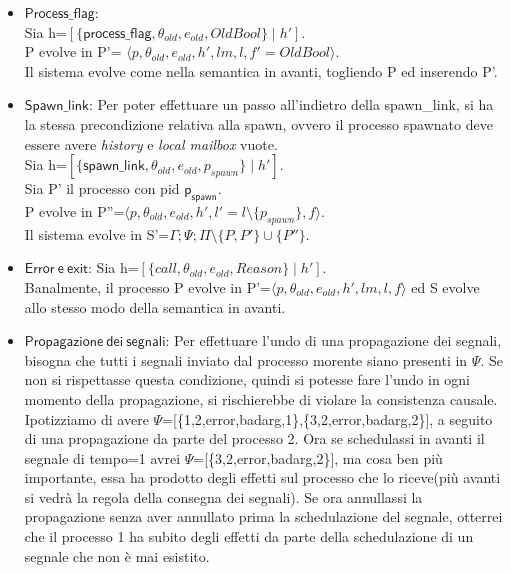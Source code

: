 \documentclass[Contributo.tex]{subfiles}
\begin{document}
	\begin{itemize}
		\item $\mathsf{Process\_flag}$:\\
		Sia h=$\displaystyle [\{\mathsf{process\_flag},\theta_{old},e_{old},OldBool\} \mid h']$.\\
		P evolve in P'= $\displaystyle \langle p,\theta_{old},e_{old},h',lm,l,f'=OldBool \rangle$.\\
		Il sistema evolve come nella semantica in avanti, togliendo P ed inserendo P'.
		\item $\mathsf{Spawn\_link}$:
		Per poter effettuare un passo all'indietro della spawn\_link, si ha la stessa precondizione relativa alla spawn, ovvero il processo spawnato deve essere avere \textit{history} e \textit{local mailbox} vuote.\\
		Sia h=$\displaystyle [\{\mathsf{spawn\_link},\theta_{old},e_{old},p_{spawn}\} \mid h']$.\\
		Sia P' il processo con pid $\mathsf{p_{spawn}}$.\\
		P evolve in P''=$\displaystyle \langle p,\theta_{old},e_{old},h',l'=l \setminus \{p_{spawn}\},f \rangle$.\\
		Il sistema evolve in S'=$\displaystyle \Gamma;\Psi;\Pi\setminus\{P,P'\}\cup\{P''\}$.
		\item $\mathsf{Error~e~exit}$: Sia h=$\displaystyle [\{call,\theta_{old},e_{old},Reason\} \mid h']$.\\
		Banalmente, il processo P evolve in P'=$\displaystyle \langle p,\theta_{old},e_{old},h',lm,l,f \rangle$ ed S evolve allo stesso modo della semantica in avanti.
		\item $\mathsf{Propagazione~dei~segnali}$: Per effettuare l'undo di una propagazione dei segnali, bisogna che tutti i segnali inviato dal processo morente siano presenti in $\Psi$.
		Se non si rispettasse questa condizione, quindi si potesse fare l'undo in ogni momento della propagazione, si rischierebbe di violare la consistenza causale.\\
		Ipotizziamo di avere $\Psi$=[\{1,2,error,badarg,1\},\{3,2,error,badarg,2\}], a seguito di una propagazione da parte del processo 2. Ora se schedulassi in avanti il segnale di tempo=1 avrei $\Psi$=[\{3,2,error,badarg,2\}], ma cosa ben più importante, essa ha prodotto degli effetti sul processo che lo riceve(più avanti si vedrà la regola della consegna dei segnali). Se ora annullassi la propagazione senza aver annullato prima la schedulazione del segnale, otterrei che il processo 1 ha subito degli effetti da parte della schedulazione di un segnale che non è mai esistito.

\end{itemize}
\end{document}
